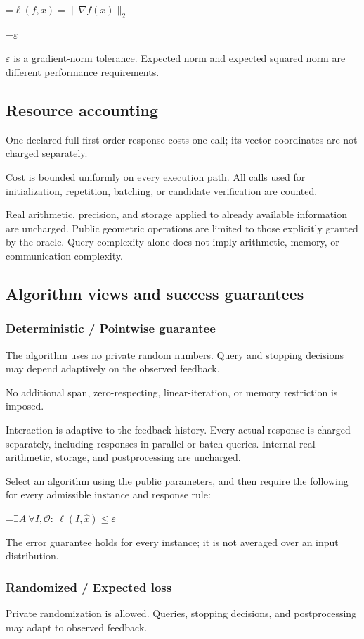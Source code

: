 \documentclass[10pt,a4paper]{article}
\newcommand{\AtlasMath}[1]{\par\begingroup\centering\setbox0=\hbox{$\displaystyle #1$}\ifdim\wd0>1.4\linewidth\typeout{ATLAS WIDE FORMULA: \the\wd0}\fi\ifdim\wd0>\linewidth\resizebox{\linewidth}{!}{\box0}\else\box0\fi\par\endgroup}
\newcommand{\AtlasInlineMath}[1]{\begingroup\setbox0=\hbox{$#1$}\ifdim\wd0>.4\linewidth\endgroup\AtlasMath{#1}\else\endgroup$#1$\fi}
\begin{document}
\AtlasMath{\ell(f,x)=\|\nabla f(x)\|_2}


\AtlasInlineMath{\varepsilon} is a gradient-norm tolerance. Expected norm and expected squared norm are different performance requirements.

\subsection{Resource accounting}
One declared full first-order response costs one call; its vector coordinates are not charged separately.

Cost is bounded uniformly on every execution path. All calls used for initialization, repetition, batching, or candidate verification are counted.

Real arithmetic, precision, and storage applied to already available information are uncharged. Public geometric operations are limited to those explicitly granted by the oracle. Query complexity alone does not imply arithmetic, memory, or communication complexity.

\subsection{Algorithm views and success guarantees}
\subsubsection{Deterministic / Pointwise guarantee}
The algorithm uses no private random numbers. Query and stopping decisions may depend adaptively on the observed feedback.

No additional span, zero-respecting, linear-iteration, or memory restriction is imposed.

Interaction is adaptive to the feedback history. Every actual response is charged separately, including responses in parallel or batch queries. Internal real arithmetic, storage, and postprocessing are uncharged.

Select an algorithm using the public parameters, and then require the following for every admissible instance and response rule:


\AtlasMath{\exists A\ \forall I,\mathcal{O}:\ \ell(I,\widehat{x})\le\varepsilon}


The error guarantee holds for every instance; it is not averaged over an input distribution.

\subsubsection{Randomized / Expected loss}
Private randomization is allowed. Queries, stopping decisions, and postprocessing may adapt to observed feedback.
\end{document}
